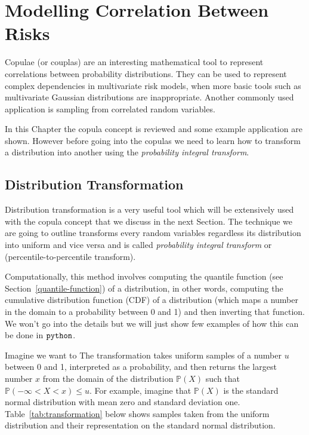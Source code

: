 \chapter{Modelling Correlation Between Risks}

Copulae (or couplas) are an interesting mathematical tool to represent correlations between probability distributions. They can be used to represent complex dependencies in multivariate risk models, when more basic tools such as multivariate Gaussian distributions are inappropriate. Another commonly used application is sampling from correlated random variables.

In this Chapter the copula concept is reviewed and some example application are shown. However before going into the copulas we need to learn how to transform a distribution into another using the \emph{probability integral transform}. 


\section{Distribution Transformation}\label{distribution-transformation}

Distribution transformation is a very useful tool which will be
extensively used with the copula concept that we discuss in the next
Section. The technique we are going to outline transforms every random
variables regardless its distribution into uniform and vice versa and is called
\emph{probability integral transform} or (percentile-to-percentile
transform).

Computationally, this method involves computing the quantile function (see Section~\ref{quantile-function}) of
a distribution, in other words, computing the cumulative
distribution function (CDF) of a distribution (which maps a number in
the domain to a probability between 0 and 1) and then inverting that
function. We won't go into the details but we will just show few
examples of how this can be done in \(\tt{python}\).

Imagine we want to 
The transformation takes uniform samples of a number \(u\) between 0 and
1, interpreted as a probability, and then returns the largest number
\(x\) from the domain of the distribution \(\mathbb{P}(X)\) such that
\(\mathbb{P}(-\infty <X<x)\le u\). For example, imagine that
\(\mathbb{P}(X)\) is the standard normal distribution with mean zero and
standard deviation one. Table~\ref{tab:transformation} below shows samples taken from the
uniform distribution and their representation on the standard normal
distribution.

